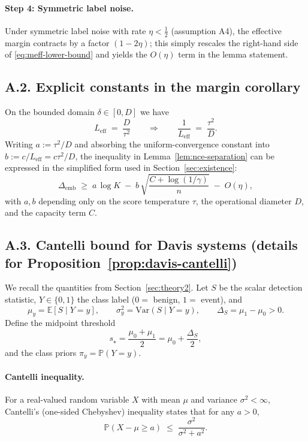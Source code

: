 \documentclass[11pt]{article}
\begin{document}
\paragraph{Step 4: Symmetric label noise.}
Under symmetric label noise with rate $\eta<\tfrac12$ (assumption A4), the effective margin
contracts by a factor $(1-2\eta)$; this simply rescales the right-hand side of
\eqref{eq:meff-lower-bound} and yields the $O(\eta)$ term in the lemma statement.  \qedhere

\medskip

\subsection*{A.2. Explicit constants in the margin corollary}

On the bounded domain $\delta\in[0,D]$ we have
\[
L_{\mathrm{eff}} \;=\; \frac{D}{\tau^2}
\qquad\Longrightarrow\qquad
\frac{1}{L_{\mathrm{eff}}} \;=\; \frac{\tau^2}{D}.
\]
Writing $a := \tau^2/D$ and absorbing the uniform-convergence constant into $b := c/L_{\mathrm{eff}}
= c\tau^2/D$, the inequality in Lemma~\ref{lem:nce-separation} can be expressed in the simplified
form used in Section~\ref{sec:existence}:
\[
\Delta_{\mathrm{emb}}
\;\ge\;
a\,\log K
\;-\;
b\,\sqrt{\frac{C + \log(1/\gamma)}{n}}
\;-\;
O(\eta),
\]
with $a,b$ depending only on the score temperature $\tau$, the operational diameter $D$, and
the capacity term $C$.

\medskip

\subsection*{A.3. Cantelli bound for Davis systems (details for Proposition~\ref{prop:davis-cantelli})}

We recall the quantities from Section~\ref{sec:theory2}. Let $S$ be the scalar detection statistic,
$Y\in\{0,1\}$ the class label ($0=$ benign, $1=$ event), and
\[
\mu_y = \mathbb{E}[S\mid Y=y],\qquad
\sigma_y^2 = \mathrm{Var}(S\mid Y=y),
\qquad
\Delta_S = \mu_1 - \mu_0 > 0.
\]
Define the midpoint threshold
\[
s_\star = \frac{\mu_0 + \mu_1}{2} = \mu_0 + \frac{\Delta_S}{2},
\]
and the class priors $\pi_y = \mathbb{P}(Y=y)$.

\paragraph{Cantelli inequality.}
For a real-valued random variable $X$ with mean $\mu$ and variance $\sigma^2<\infty$, Cantelli’s
(one-sided Chebyshev) inequality states that for any $a>0$,
\[
\mathbb{P}(X-\mu \ge a)
\;\le\;
\frac{\sigma^2}{\sigma^2 + a^2}.
\]
\end{document}
